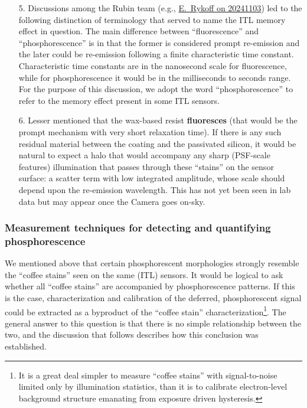 \begin{itemize}
    \item[5.] Discussions among the Rubin team (e.g., \href{https://rubin-obs.slack.com/archives/C07QS3Z25PU/p1730661864474399}{E.~Rykoff on 20241103}) led to the following distinction of terminology that served to name the ITL memory effect in question. The main difference between ``fluorescence'' and ``phosphorescence'' is in that the former is considered prompt re-emission and the later could be re-emission following a finite characteristic time constant. Characteristic time constants are in the nanosecond scale for fluorescence, while for phosphorescence it would be in the milliseconds to seconds range. For the purpose of this discussion, we adopt the word ``phosphorescence'' to refer to the memory effect present in some ITL sensors.
    \item[6.] Lesser mentioned that the wax-based resist {\bf fluoresces} (that would be the prompt mechanism with very short relaxation time). If there is any such residual material between the coating and the passivated silicon, it would be natural to expect a halo that would accompany any sharp (PSF-scale features) illumination that passes through these ``stains'' on the sensor surface: a scatter term with low integrated amplitude, whose scale should depend upon the re-emission wavelength. This has not yet been seen in lab data but may appear once the Camera goes on-sky.

\end{itemize}

\subsubsection{Measurement techniques for detecting and quantifying phosphorescence}\label{phos-measurement}
We mentioned above that certain phosphorescent morphologies strongly resemble the ``coffee stains'' seen on the same (ITL) sensors. It would be logical to ask whether all ``coffee stains'' are accompanied by phosphorescence patterns. If this is the case, characterization and calibration of the deferred, phosphorescent signal could be extracted as a byproduct of the ``coffee stain'' characterization\footnote{It is a great deal simpler to measure ``coffee stains'' with signal-to-noise limited only by illumination statistics, than it is to calibrate electron-level background structure emanating from exposure driven hysteresis.}. The general answer to this question is that there is no simple relationship between the two, and the discussion that follows describes how this conclusion was established.

